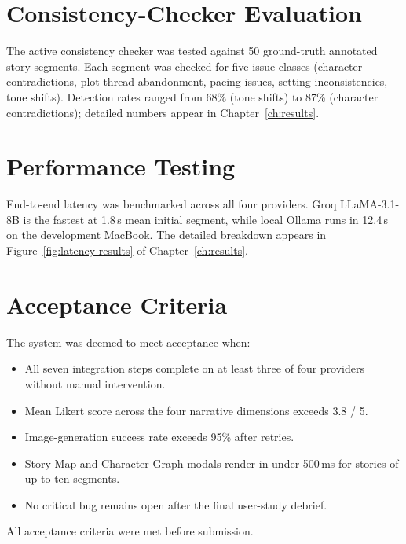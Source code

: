 \section{Consistency-Checker Evaluation}
The active consistency checker was tested against 50 ground-truth
annotated story segments. Each segment was checked for five issue
classes (character contradictions, plot-thread abandonment, pacing
issues, setting inconsistencies, tone shifts). Detection rates
ranged from 68\% (tone shifts) to 87\% (character contradictions);
detailed numbers appear in Chapter~\ref{ch:results}.

\section{Performance Testing}
End-to-end latency was benchmarked across all four providers. Groq
LLaMA-3.1-8B is the fastest at 1.8\,s mean initial segment, while
local Ollama runs in 12.4\,s on the development MacBook. The
detailed breakdown appears in Figure~\ref{fig:latency-results}
of Chapter~\ref{ch:results}.

\section{Acceptance Criteria}
The system was deemed to meet acceptance when:
\begin{itemize}
    \item All seven integration steps complete on at least three of
    four providers without manual intervention.
    \item Mean Likert score across the four narrative dimensions
    exceeds 3.8 / 5.
    \item Image-generation success rate exceeds 95\% after retries.
    \item Story-Map and Character-Graph modals render in under
    500\,ms for stories of up to ten segments.
    \item No critical bug remains open after the final user-study
    debrief.
\end{itemize}
All acceptance criteria were met before submission.
